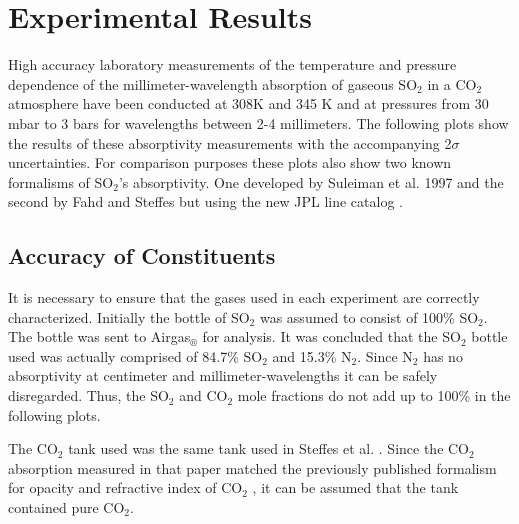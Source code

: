 \clearpage
\section{Experimental Results}
High accuracy laboratory measurements of the temperature and pressure dependence of the millimeter-wavelength absorption of gaseous SO$_2$ in a CO$_2$ atmosphere have been conducted at 308K and 345 K and at pressures from 30 mbar to 3 bars for wavelengths between 2-4 millimeters. The following plots show the results of these absorptivity measurements with the accompanying 2$\sigma$ uncertainties. For comparison purposes these plots also show two known formalisms of SO$_2$'s absorptivity. One developed by Suleiman et al. 1997 \cite{Suleiman-thesis} and the second by Fahd and Steffes \cite{Fahd-thesis} but using the new JPL line catalog \cite{Pickett-1998}. 

\subsection{Accuracy of Constituents}

It is necessary to ensure that the gases used in each experiment are correctly characterized. Initially the bottle of SO$_2$ was assumed to consist of 100\% SO$_2$. The bottle was sent to Airgas$_\circledR$ for analysis. It was concluded that the SO$_2$ bottle used was actually comprised of 84.7\% SO$_2$ and 15.3\% N$_2$. Since N$_2$ has no absorptivity at centimeter and millimeter-wavelengths it can be safely disregarded. Thus, the SO$_2$  and CO$_2$ mole fractions do not add up to 100\% in the following plots. 




The CO$_2$ tank used was the same tank used in Steffes et al. \cite{Steffes-2014}. Since the CO$_2$ absorption measured in that paper matched the previously published formalism for opacity and refractive index of CO$_2$ \cite{Ho-1966}, it can be assumed that the tank contained pure CO$_2$.

